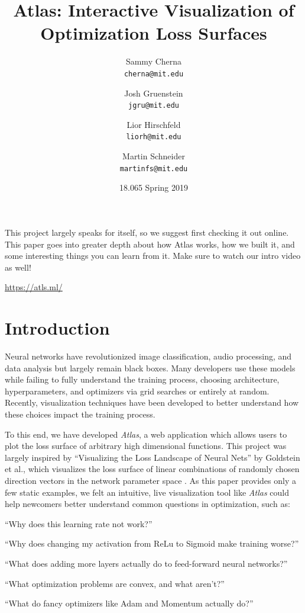 \documentclass[letterpaper]{article}
\title{Atlas: Interactive Visualization of Optimization Loss Surfaces}
\author{
    Sammy Cherna\\\texttt{cherna@mit.edu} \and
    Josh Gruenstein\\\texttt{jgru@mit.edu} \and
    Lior Hirschfeld\\\texttt{liorh@mit.edu} \and
    Martin Schneider\\\texttt{martinfs@mit.edu}
}
\date{18.065 Spring 2019}
\begin{document}
\maketitle

This project largely speaks for itself, so we suggest first checking it out online.  This paper goes into greater depth about how Atlas works, how we built it, and some interesting things you can learn from it. Make sure to watch our intro video as well!

\begin{center}
  \url{https://atls.ml/}
\end{center}

\section{Introduction}
Neural networks have revolutionized image classification, audio processing, and data analysis but largely remain black boxes. Many developers use these models while failing to fully understand the training process, choosing architecture, hyperparameters, and optimizers via grid searches or entirely at random. Recently, visualization techniques have been developed to better understand how these choices impact the training process.

To this end, we have developed \textit{Atlas}, a web application which allows users to plot the loss surface of arbitrary high dimensional functions. This project was largely inspired by ``Visualizing the Loss Landscape of Neural Nets'' by Goldstein et al., which visualizes the loss surface of linear combinations of randomly chosen direction vectors in the network parameter space \cite{li2018visualizing}. As this paper provides only a few static examples, we felt an intuitive, live visualization tool like \textit{Atlas} could help newcomers better understand common questions in optimization, such as:

\begin{list}{}{}
    \item ``Why does this learning rate not work?''
    \item ``Why does changing my activation from ReLu to Sigmoid make training worse?''
    \item ``What does adding more layers actually do to feed-forward neural networks?''
    \item ``What optimization problems are convex, and what aren't?''
    \item ``What do fancy optimizers like Adam and Momentum actually do?''
\end{list}
\end{document}
